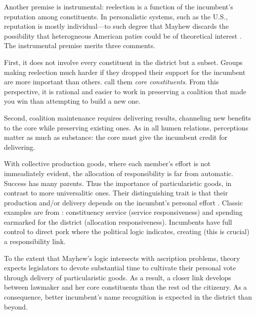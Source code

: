 \documentclass[letter,12pt]{article}
\begin{document}
Another premise is instrumental: reelection is a function of the incumbent's reputation among constituents. In personalistic systems, such as the U.S., reputation is mostly individual---to such degree that Mayhew discards the possibility that heterogneous American paties could be of theoretical interest \citep[but revisionists rescued party relevance in Mayhew's framework,][]{cox.mccubbins.1993,aldrich.1995}. The instrumental premise merits three comments. 

First, it does not involve every constituent in the district but a subset. Groups making reelection much harder if they dropped their support for the incumbent are more important than others. \citet{cox.mccubbins.1986} call them \emph{core constituents}. From this perspective, it is rational and easier to work in preserving a coalition that made you win than attempting to build a new one.

Second, coalition maintenance requires delivering results, channeling new benefits to the core while preserving existing ones. As in all humen relations, perceptions matter as much as substance: the core must give the incumbent credit for delivering. 

With collective production goods, where each member's effort is not immeadiately evident, the allocation of responsibility is far from automatic. Success has many parents. Thus the importance of particularistic goods, in contrast to more universalitic ones. Their distinguishing trait is that their production and/or delivery depends on the incumbnt's personal effort \citep{haggard.mccubbins.2001}. Classic examples are from \citet{cain.etal.1987}: constituency service (service responsiveness) and spending earmarked for the district (allocation responsiveness). Incumbents have full control to direct pork where the political logic indicates, creating (this is crucial) a responsibility link.

To the extent that Mayhew's logic intersects with ascription problems, theory expects legislators to devote substantial time to cultivate their personal vote through delivery of particularistic goods. As a result, a closer link develops between lawmaker and her core constituents than the rest od the citizenry. As a consequence, better incumbent's name recognition is expected in the district than beyond. 

\end{document}
